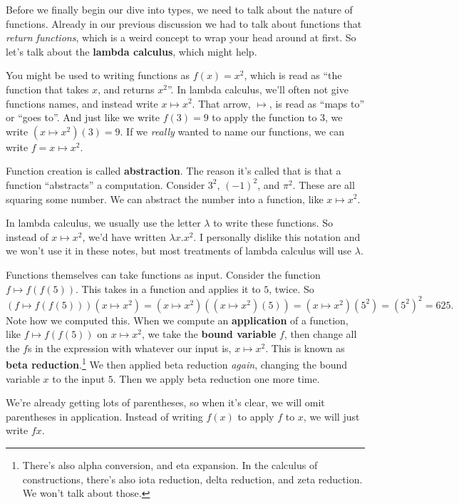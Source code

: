 \documentclass[11pt,paper=letter]{scrartcl}
\begin{document}
Before we finally begin our dive into types, we need to talk about the nature of functions. Already in our previous discussion we had to talk about functions that \emph{return functions}, which is a weird concept to wrap your head around at first. So let's talk about the \textbf{lambda calculus}, which might help.

You might be used to writing functions as $f(x) = x^2$, which is read as ``the function that takes $x$, and returns $x^2$''. In lambda calculus, we'll often not give functions names, and instead write $x \mapsto x^2$. That arrow, $\mapsto$, is read as ``maps to'' or ``goes to''. And just like we write $f(3) = 9$ to apply the function to $3$, we write $(x \mapsto x^2)(3) = 9$. If we \emph{really} wanted to name our functions, we can write $f = x \mapsto x^2$.

Function creation is called \textbf{abstraction}. The reason it's called that is that a function ``abstracts'' a computation. Consider $3^2$, $(-1)^2$, and $\pi^2$. These are all squaring some number. We can abstract the number into a function, like $x \mapsto x^2$.

In lambda calculus, we usually use the letter $\lambda$ to write these functions. So instead of $x \mapsto x^2$, we'd have written $\lambda x.x^2$. I personally dislike this notation and we won't use it in these notes, but most treatments of lambda calculus will use $\lambda$.

Functions themselves can take functions as input. Consider the function $f \mapsto f(f(5))$. This takes in a function and applies it to $5$, twice. So \[
  (f \mapsto f(f(5)))(x \mapsto x^2)
  = (x \mapsto x^2)((x \mapsto x^2)(5))
  = (x \mapsto x^2)(5^2)
  = (5^2)^2
  = 625.
\]
Note how we computed this. When we compute an \textbf{application} of a function, like $f \mapsto f(f(5))$ on $x \mapsto x^2$, we take the \textbf{bound variable} $f$, then change all the $f$s in the expression with whatever our input is, $x \mapsto x^2$. This is known as \textbf{beta reduction}.\footnote{There's also alpha conversion, and eta expansion. In the calculus of constructions, there's also iota reduction, delta reduction, and zeta reduction. We won't talk about those.} We then applied beta reduction \emph{again}, changing the bound variable $x$ to the input $5$. Then we apply beta reduction one more time.

We're already getting lots of parentheses, so when it's clear, we will omit parentheses in application. Instead of writing $f(x)$ to apply $f$ to $x$, we will just write $fx$.
\end{document}
